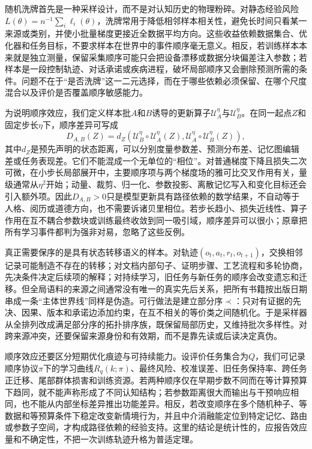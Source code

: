 随机洗牌首先是一种采样设计，而不是对认知历史的物理粉碎。对静态经验风险$L(\theta)=n^{-1}\sum_i\ell_i(\theta)$，洗牌常用于降低相邻样本相关性，避免长时间只看某一来源或类别，并使小批量梯度更接近全数据平均方向。这些收益依赖数据集合、优化器和任务目标，不要求样本在世界中的事件顺序毫无意义。相反，若训练样本本来就是独立测量，保留采集顺序可能只会把设备漂移或数据分块偏差注入参数；若样本是一段控制轨迹、对话承诺或疾病进程，破坏局部顺序又会删除预测所需的条件。问题不在于“是否洗牌”这一二元选择，而在于哪些依赖必须保留、在哪个尺度混合以及评价是否覆盖顺序敏感能力。

为说明顺序效应，我们定义样本批$A$和$B$诱导的更新算子$\mathcal{U}_A^{\eta}$与$\mathcal{U}_B^{\eta}$。在同一起点$Z$和固定步长$\eta$下，顺序差异可写成
\[
D_{A,B}(Z)=d_Z\!\left(\mathcal{U}_B^{\eta}\!\circ\mathcal{U}_A^{\eta}(Z),
\mathcal{U}_A^{\eta}\!\circ\mathcal{U}_B^{\eta}(Z)\right),
\]
其中$d_Z$是预先声明的状态距离，可以分别度量参数差、预测分布差、记忆图编辑差或任务表现差。它们不能混成一个无单位的“相位”。对普通梯度下降且损失二次可微，在小步长局部展开中，主要顺序项与两个梯度场的雅可比交叉作用有关，量级通常从$\eta^2$开始；动量、裁剪、归一化、参数投影、离散记忆写入和变化目标还会引入额外项。因此$D_{A,B}>0$只是模型更新具有路径依赖的数学结果，不自动等于人格、阅历或道德方向，也不需要诉诸贝里相位。若步长趋小、损失近线性、算子作用在互不耦合参数块或训练最终收敛到同一吸引域，顺序差异可以很小；原章把所有学习事件都判为强非对易，忽略了这些反例。

真正需要保序的是具有状态转移语义的样本。对轨迹$(o_t,a_t,r_t,o_{t+1})$，交换相邻记录可能制造不存在的转移；对文档内部句子、证明步骤、工艺流程和多轮协商，先决条件决定后续项的解释；对持续学习，旧任务与新任务的顺序会改变遗忘和迁移。但全局语料的来源之间通常没有唯一的真实先后关系，把所有书籍按出版日期串成一条“主体世界线”同样是伪造。可行做法是建立部分序$\prec$：只对有证据的先决、因果、版本和承诺边添加约束，在互不相关的等价类之间随机化。于是采样器从全排列改成满足部分序的拓扑排序族，既保留局部历史，又维持批次多样性。对跨来源冲突，还要保留来源身份和有效期，而不是靠先读或后读决定真伪。

顺序效应还要区分短期优化痕迹与可持续能力。设评价任务集合为$Q$，我们可记录顺序协议$\pi$下的学习曲线$R_q(k;\pi)$、最终风险、校准误差、旧任务保持率、跨任务正迁移、尾部群体损害和训练资源。若两种顺序仅在早期步数不同而在等计算预算下趋同，就不能声称形成了不同认知结构；若参数距离很大而输出与干预响应相同，也不能从内部坐标差异推出功能差异。相反，若改变顺序在多个随机种子、等数据和等预算条件下稳定改变新情境行为，并且中介消融能定位到特定记忆、路由或参数子空间，才构成路径依赖的经验支持。这里的结论是统计性的，应报告效应量和不确定性，不把一次训练轨迹升格为普适定理。

